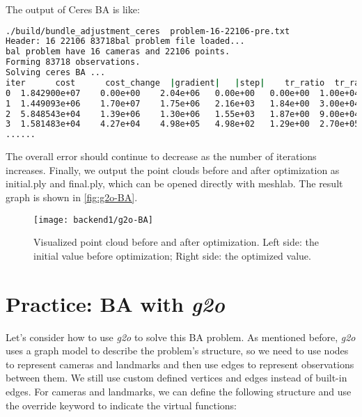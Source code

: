 The output of Ceres BA is like:
\begin{lstlisting}[language=sh,caption=Terminal output]
./build/bundle_adjustment_ceres  problem-16-22106-pre.txt                
Header: 16 22106 83718bal problem file loaded...
bal problem have 16 cameras and 22106 points. 
Forming 83718 observations. 
Solving ceres BA ... 
iter      cost      cost_change  |gradient|   |step|    tr_ratio  tr_radius  ls_iter  iter_time  total_time
0  1.842900e+07    0.00e+00    2.04e+06   0.00e+00   0.00e+00  1.00e+04        0    6.10e-02    2.24e-01
1  1.449093e+06    1.70e+07    1.75e+06   2.16e+03   1.84e+00  3.00e+04        1    1.79e-01    4.03e-01
2  5.848543e+04    1.39e+06    1.30e+06   1.55e+03   1.87e+00  9.00e+04        1    1.56e-01    5.59e-01
3  1.581483e+04    4.27e+04    4.98e+05   4.98e+02   1.29e+00  2.70e+05        1    1.51e-01    7.10e-01
......
\end{lstlisting}

The overall error should continue to decrease as the number of iterations increases. Finally, we output the point clouds before and after optimization as initial.ply and final.ply, which can be opened directly with meshlab. The result graph is shown in \autoref{fig:g2o-BA}.

\begin{figure}[!htp]
	\centering
	\texttt{[image: backend1/g2o-BA]}
	\caption{Visualized point cloud before and after optimization. Left side: the initial value before optimization; Right side: the optimized value.}
	\label{fig:g2o-BA}
\end{figure}

\section{Practice: BA with \textit{g2o}}
Let's consider how to use \textit{g2o} to solve this BA problem. As mentioned before, \textit{g2o} uses a graph model to describe the problem's structure, so we need to use nodes to represent cameras and landmarks and then use edges to represent observations between them. We still use custom defined vertices and edges instead of built-in edges. For cameras and landmarks, we can define the following structure and use the override keyword to indicate the virtual functions:

